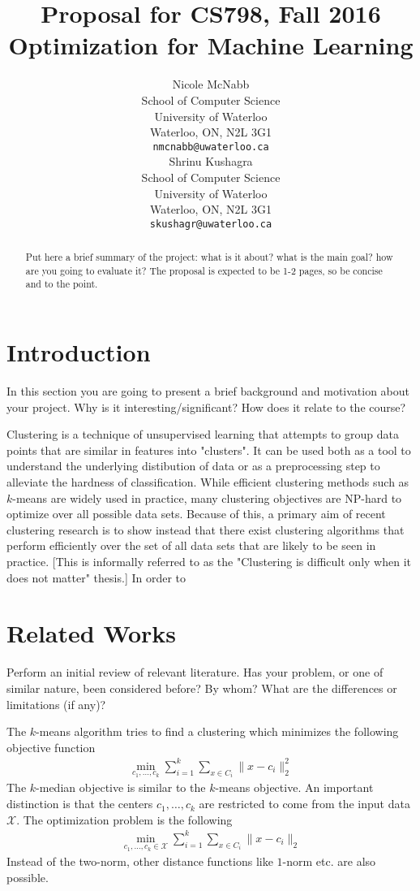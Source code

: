 \documentclass{article}
\title{Proposal for CS798, Fall 2016\\ \large Optimization for Machine Learning}
\author{
	Nicole McNabb \\
	School of Computer Science\\
	University of Waterloo\\
	Waterloo, ON, N2L 3G1 \\
	\texttt{nmcnabb@uwaterloo.ca} \\
	\And
	Shrinu Kushagra\\
	School of Computer Science\\
	University of Waterloo\\
	Waterloo, ON, N2L 3G1 \\
	\texttt{skushagr@uwaterloo.ca} \\	
}
\newcommand{\mc}{\mathcal}
\begin{document}
\maketitle

\begin{abstract} 
Put here a brief summary of the project: what is it about? what is the main goal? how are you going to evaluate it? The proposal is expected to be 1-2 pages, so be concise and to the point.
\end{abstract} 

\section{Introduction}
In this section you are going to present a brief background and motivation about your project. Why is it interesting/significant? How does it relate to the course?

Clustering is a technique of unsupervised learning that attempts to group data points that are similar in features into "clusters". It can be used both as a tool to understand the underlying distibution of data or as a preprocessing step to alleviate the hardness of classification. While efficient clustering methods such as $k$-means are widely used in practice, many clustering objectives are NP-hard to optimize over all possible data sets. Because of this, a primary aim of recent clustering research is to show instead that there exist  clustering algorithms that perform efficiently over the set of all data sets that are likely to be seen in practice. [This is informally referred to as the "Clustering is difficult only when it does not matter" thesis.] In order to 

\section{Related Works}
Perform an initial review of relevant literature. Has your problem, or one of similar nature, been considered before? By whom? What are the differences or limitations (if any)? 

The $k$-means algorithm tries to find a clustering which minimizes the following objective function
\begin{align*}
	\min_{c_1, \ldots, c_k} \sum_{i=1}^k \sum_{x \in C_i} \|x-c_i\|_2^2 
\end{align*}
The $k$-median objective is similar to the $k$-means objective. An important distinction is that the centers $c_1, \ldots, c_k$ are restricted to come from the input data $\mc X$. The optimization problem is the following 
\begin{align*}
	\min_{c_1, \ldots, c_k \in \mc X} \sum_{i=1}^k \sum_{x \in C_i} \|x-c_i\|_2 
\end{align*}
Instead of the two-norm, other distance functions like $1$-norm etc. are also possible.
\end{document}
